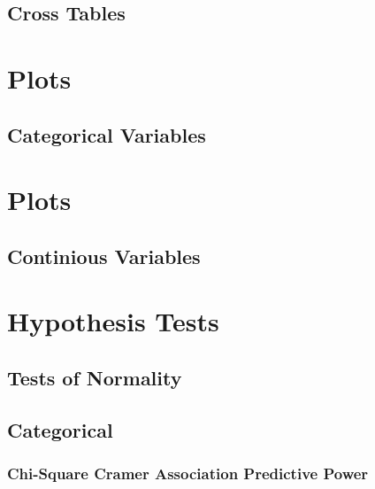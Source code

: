 \documentclass[]{article}
\begin{document}
\pagebreak

\newpage
\begin{landscape}

\hypertarget{cross-tables}{%
\section{Cross Tables}\label{cross-tables}}

\end{landscape}

\hypertarget{plots}{%
\section{Plots}\label{plots}}

\hypertarget{categorical-variables-1}{%
\subsection{Categorical Variables}\label{categorical-variables-1}}

\hypertarget{plots-1}{%
\section{Plots}\label{plots-1}}

\hypertarget{continious-variables-1}{%
\subsection{Continious Variables}\label{continious-variables-1}}

\hypertarget{hypothesis-tests}{%
\section{Hypothesis Tests}\label{hypothesis-tests}}

\hypertarget{tests-of-normality}{%
\subsection{Tests of Normality}\label{tests-of-normality}}

\hypertarget{categorical}{%
\subsection{Categorical}\label{categorical}}

\hypertarget{chi-square-cramer-association-predictive-power}{%
\subsubsection{Chi-Square Cramer Association Predictive
Power}\label{chi-square-cramer-association-predictive-power}}
\end{document}
